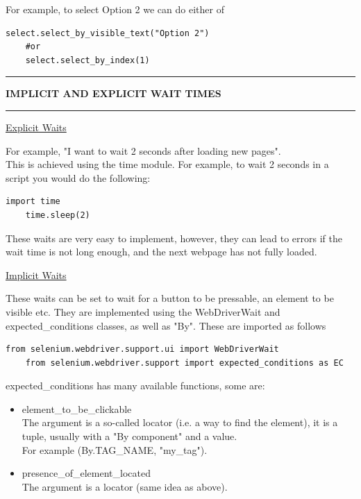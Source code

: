 \documentclass[8pt]{extarticle}
\newcommand{\heading}[1]{%
    \noindent
    \rule{\linewidth}{0.4pt}
    \begin{center}
        \vspace{-1ex}
        \textbf{#1}        
        \vspace{-2.5ex}
    \end{center}
    \rule{\linewidth}{0.4pt}
}
\begin{document}
\begin{multicols}{3}
For example, to select Option 2 we can do either of
\begin{lstlisting}[style=python]   
    select.select_by_visible_text("Option 2")
    #or
    select.select_by_index(1)
\end{lstlisting}

\heading{IMPLICIT AND EXPLICIT WAIT TIMES}

\begin{center}
    \underline{Explicit Waits}
\end{center}

For example, "I want to wait 2 seconds after loading new pages".\\

This is achieved using the time module. For example, to wait 2 seconds in a script you would do the following:

\begin{lstlisting}[style=python]   
    import time
    time.sleep(2)
\end{lstlisting}

These waits are very easy to implement, however, they can lead to errors if the wait time is not long enough, and the next webpage has not fully loaded.

\begin{center}
    \underline{Implicit Waits}
\end{center}

These waits can be set to wait for a button to be pressable, an element to be visible etc. They are implemented using the WebDriverWait and expected\_conditions classes, as well as "By". These are imported as follows
\begin{lstlisting}[style=python]   
    from selenium.webdriver.support.ui import WebDriverWait
    from selenium.webdriver.support import expected_conditions as EC
\end{lstlisting}

\columnbreak
expected\_conditions has many available functions, some are:
\begin{itemize}
    \item element\_to\_be\_clickable \\
    The argument is a so-called locator (i.e. a way to find the element), it is a tuple, usually with a "By component" and a value. \\
    For example (By.TAG\_NAME, "my\_tag").
    \item presence\_of\_element\_located \\
    The argument is a locator (same idea as above).
\end{itemize}


\end{multicols}
\end{document}
